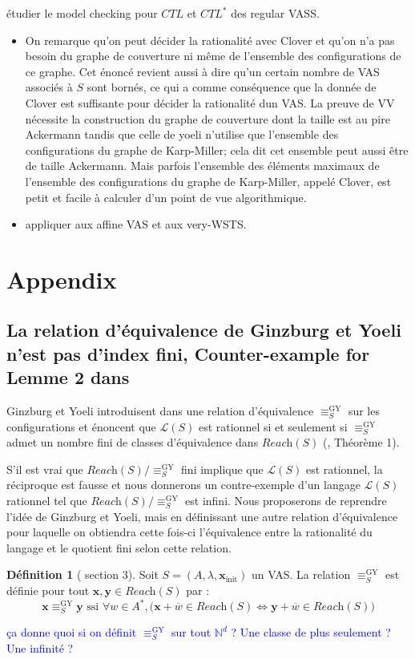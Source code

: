 \documentclass[a4paper,final]{article}
\theoremstyle{definition}
\newtheorem{Definition}[Theorem]{Définition}
\newcommand{\alain}[1]{\textcolor{blue}{#1}}
\newcommand{\N}{\ensuremath{\mathbb{N}}}
\newcommand{\lang}{\ensuremath{\mathcal{L}}}
\newcommand{\reach}{\ensuremath{\textit{Reach}}}
\newcommand{\vect}[1]{\ensuremath{\mathbf{#1}}}
\newcommand{\relGY}{\ensuremath{\equiv^\text{GY}_S}}
\newcommand{\ssi}{\ensuremath{\text{ ssi }}}
\newcommand{\equivaut}{\ensuremath{\Leftrightarrow}}
\newcommand{\xinit}{\ensuremath{\vect{x}_\text{init}}}
\newcommand{\valeur}[1]{\ensuremath{\overline{#1}}}
\begin{document}
étudier le model checking pour  $CTL$  et $CTL^*$ des regular VASS.
\begin{itemize}
  \item On remarque qu'on peut décider la rationalité avec Clover et qu'on n'a pas besoin du graphe de couverture ni même de l'ensemble des configurations de ce graphe. Cet énoncé revient aussi à dire qu'un certain nombre de VAS associés à $S$ sont bornés, ce qui a comme conséquence que la donnée de Clover est suffisante pour décider la rationalité dun VAS. La preuve de VV nécessite la construction du graphe de couverture dont la taille est au pire Ackermann tandis que celle de yoeli n'utilise que l'ensemble des configurations du graphe de Karp-Miller; cela dit cet ensemble peut aussi être de taille Ackermann. Mais parfois l'ensemble des éléments maximaux de l'ensemble des configurations du graphe de Karp-Miller, appelé Clover, est petit  et facile à calculer d'un point de vue algorithmique.  
\item appliquer aux affine VAS et aux very-WSTS.
\end{itemize}

\section{Appendix}


\subsection{La relation d'équivalence de Ginzburg et Yoeli n'est pas d'index fini, Counter-example for Lemme 2 dans \cite{giyo80}}

Ginzburg et Yoeli introduisent dans \cite{giyo80} une relation d'équivalence $\relGY$ sur les configurations et énoncent que $\lang(S)$ est rationnel si et seulement si $\relGY$ admet un nombre fini de classes d'équivalence dans $\reach(S)$ (\cite{giyo80}, Théorème 1).

S'il est vrai que $\reach(S)/\relGY$ fini implique que $\lang(S)$ est rationnel, la réciproque est fausse et nous donnerons un contre-exemple d'un langage $\lang(S)$ rationnel tel que $\reach(S)/\relGY$ est infini. 
Nous proposerons de reprendre l'idée de Ginzburg et Yoeli,
mais en définissant une autre relation d'équivalence pour laquelle on obtiendra cette fois-ci l'équivalence entre la rationalité du langage et le quotient fini selon cette relation.

\begin{Definition}[\cite{giyo80} section 3]
Soit $S=(A,\lambda,\xinit)$ un VAS. La relation $\relGY$ est définie pour tout $\vect{x},\vect{y} \in\reach(S)$ par : 
$$\vect{x}\relGY\vect{y} \ssi \forall w\in A^\ast, \big( \vect{x} +\valeur{w}\in\reach(S) \equivaut \vect{y} +\valeur{w}\in\reach(S) \big)$$
\end{Definition}
\alain{ça donne quoi si on définit $\relGY$ sur tout $\N^d$ ? Une classe de plus seulement ? Une infinité ?}
\end{document}
